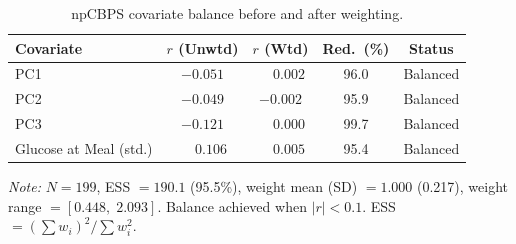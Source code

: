 \begin{table}[H]
\centering
\caption{npCBPS covariate balance before and after weighting.}
\label{tab:npcbps_diagnostics}
\small
\begin{tabular}{lcccc}
\toprule
Covariate & $r$ (Unwtd) & $r$ (Wtd) & Red.\ (\%) & Status \\
\midrule
PC1                     & $-0.051$ & $\phantom{-}0.002$ & 96.0 & Balanced \\
PC2                     & $-0.049$ & $-0.002$ & 95.9 & Balanced \\
PC3                     & $-0.121$ & $\phantom{-}0.000$ & 99.7 & Balanced \\
Glucose at Meal (std.)  & $\phantom{-}0.106$ & $\phantom{-}0.005$ & 95.4 & Balanced \\
\bottomrule
\end{tabular}
\vspace{4pt}
\begin{minipage}{0.85\textwidth}
\small
\textit{Note:} $N = 199$, ESS $= 190.1$ (95.5\%), weight mean (SD) $= 1.000$ (0.217), weight range $= [0.448,\; 2.093]$. Balance achieved when $|r| < 0.1$. ESS $= (\sum w_i)^2 / \sum w_i^2$.
\end{minipage}
\end{table}
